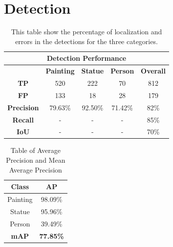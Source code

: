 \section{Detection}


\begin{table}[p]
    \centering
    \begin{tabular}{|c|c|c|c|c|}
    \hline
    \multicolumn{5}{|c|}{\textbf{Detection   Performance}}  \\ \hline
    \multicolumn{1}{|l|}{} & \textbf{Painting} & \textbf{Statue} & \textbf{Person} & \textbf{Overall} \\ \hline
    \textbf{TP}        & 520     & 222     & 70      & 812  \\ \hline
    \textbf{FP}        & 133     & 18      & 28      & 179  \\ \hline
    \textbf{Precision} & 79.63\% & 92.50\% & 71.42\% & 82\% \\ \hline
    \textbf{Recall}    & -       & -       & -       & 85\% \\ \hline
    \textbf{IoU}       & -       & -       & -       & 70\% \\ \hline
    \end{tabular}
    \caption{This table show the percentage of localization and errors in the detections for the three categories.}
    \label{tab:tabella_detection_performance}
    \end{table}

    \begin{table}[]
        \centering
        \begin{tabular}{|c|c|}
        \hline
        \textbf{Class} & \textbf{AP}      \\ \hline
        Painting       & 98.09\%          \\ \hline
        Statue         & 95.96\%          \\ \hline
        Person         & 39.49\%          \\ \hline
        \textbf{mAP}   & \textbf{77.85\%} \\ \hline
        \end{tabular}
        \caption{Table of Average Precision and Mean Average Precision}
        \label{tab:tabella_average_precision}
        \end{table}

